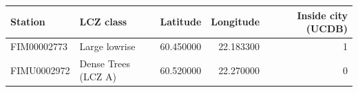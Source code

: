 \begin{tabular}{llrrr}
\toprule
Station & LCZ class & Latitude & Longitude & Inside city (UCDB) \\
\midrule
FIM00002773 & Large lowrise & 60.450000 & 22.183300 & 1 \\
FIMU0002972 & Dense Trees (LCZ A) & 60.520000 & 22.270000 & 0 \\
\bottomrule
\end{tabular}
